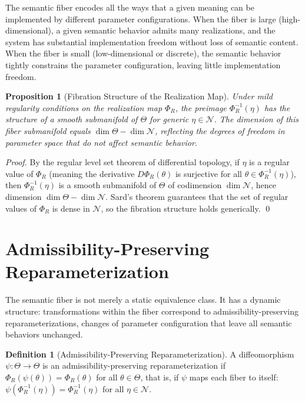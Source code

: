 \documentclass[12pt, a4paper, openany]{book}
\theoremstyle{plain}
\newtheorem{proposition}[theorem]{Proposition}
\theoremstyle{definition}
\newtheorem{definition}[theorem]{Definition}
\theoremstyle{remark}
\begin{document}
The semantic fiber encodes all the ways that a given meaning can be implemented by different parameter configurations. When the fiber is large (high-dimensional), a given semantic behavior admits many realizations, and the system has substantial implementation freedom without loss of semantic content. When the fiber is small (low-dimensional or discrete), the semantic behavior tightly constrains the parameter configuration, leaving little implementation freedom.

\begin{proposition}[Fibration Structure of the Realization Map]
Under mild regularity conditions on the realization map $\Phi_R$, the preimage $\Phi_R^{-1}(\eta)$ has the structure of a smooth submanifold of $\Theta$ for generic $\eta \in \mathcal{N}$. The dimension of this fiber submanifold equals $\dim \Theta - \dim \mathcal{N}$, reflecting the degrees of freedom in parameter space that do not affect semantic behavior.
\end{proposition}

\begin{proof}
By the regular level set theorem of differential topology, if $\eta$ is a regular value of $\Phi_R$ (meaning the derivative $D\Phi_R(\theta)$ is surjective for all $\theta \in \Phi_R^{-1}(\eta)$), then $\Phi_R^{-1}(\eta)$ is a smooth submanifold of $\Theta$ of codimension $\dim \mathcal{N}$, hence dimension $\dim \Theta - \dim \mathcal{N}$. Sard's theorem guarantees that the set of regular values of $\Phi_R$ is dense in $\mathcal{N}$, so the fibration structure holds generically. \qed
\end{proof}

\section{Admissibility-Preserving Reparameterization}

The semantic fiber is not merely a static equivalence class. It has a dynamic structure: transformations within the fiber correspond to admissibility-preserving reparameterizations, changes of parameter configuration that leave all semantic behaviors unchanged.

\begin{definition}[Admissibility-Preserving Reparameterization]
A diffeomorphism $\psi: \Theta \to \Theta$ is an admissibility-preserving reparameterization if $\Phi_R(\psi(\theta)) = \Phi_R(\theta)$ for all $\theta \in \Theta$, that is, if $\psi$ maps each fiber to itself: $\psi(\Phi_R^{-1}(\eta)) = \Phi_R^{-1}(\eta)$ for all $\eta \in \mathcal{N}$.
\end{definition}
\end{document}
